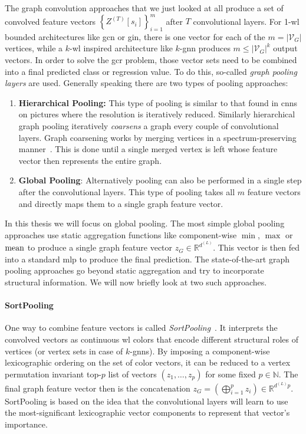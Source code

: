 The graph convolution approaches that we just looked at all produce a set of convolved feature vectors ${\left\{ Z^{(T)}[s_i] \right\}}_{i=1}^{m}$ after $T$ convolutional layers. %
For 1-\acs{wl} bounded architectures like \ac{gcn} or \ac{gin}, there is one vector for each of the $m = {|\mathcal{V}_G|}$ vertices, while a $k$-\acs{wl} inspired architecture like $k$-\acs{gnn} produces $m \leq {|\mathcal{V}_G|}^{k}$ output vectors.
In order to solve the \ac{gcr} problem, those vector sets need to be combined into a final predicted class or regression value.
To do this, so-called \textit{graph pooling layers} are used.
Generally speaking there are two types of pooling approaches:
\begin{enumerate}[label=\textbf{\arabic*.}]
	\item \textbf{Hierarchical Pooling:}
		This type of pooling is similar to that found in \acp{cnn} on pictures where the resolution is iteratively reduced.
		Similarly hierarchical graph pooling iteratively \textit{coarsens} a graph every couple of convolutional layers.
		Graph coarsening works by merging vertices in a spectrum-preserving manner~\cite{Loukas2018}.
		This is done until a single merged vertex is left whose feature vector then represents the entire graph.
	\item \textbf{Global Pooling}:
		Alternatively pooling can also be performed in a single step after the convolutional layers.
		This type of pooling takes all $m$ feature vectors and directly maps them to a single graph feature vector.
\end{enumerate}
In this thesis we will focus on global pooling.
The most simple global pooling approaches use static aggregation functions like component-wise $\min$, $\max$ or $\operatorname{mean}$ to produce a single graph feature vector $z_G \in \mathbb{R}^{d^{(L)}}$.
This vector is then fed into a standard \ac{mlp} to produce the final prediction.
The state-of-the-art graph pooling approaches go beyond static aggregation and try to incorporate structural information.
We will now briefly look at two such approaches.

\paragraph{SortPooling}
One way to combine feature vectors is called \textit{SortPooling}~\cite{Zhang2018}.
It interprets the convolved vectors as continuous \ac{wl} colors that encode different structural roles of vertices (or vertex sets in case of $k$-\acp{gnn}).
By imposing a component-wise lexicographic ordering on the set of color vectors, it can be reduced to a vertex permutation invariant top-$p$ list of vectors $(z_1, \dots, z_p)$ for some fixed $p \in \mathbb{N}$.
The final graph feature vector then is the concatenation $z_G = \left( \bigoplus_{i=1}^{p} z_i \right) \in \mathbb{R}^{d^{(L)} p}$.
SortPooling is based on the idea that the convolutional layers will learn to use the most-significant lexicographic vector components to represent that vector's importance.

